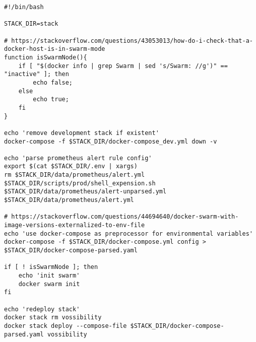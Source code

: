\begin{lstlisting}[style=bashStyle,caption={start-stack-services.sh},label=lst:start-stack-services]
#!/bin/bash

STACK_DIR=stack

# https://stackoverflow.com/questions/43053013/how-do-i-check-that-a-docker-host-is-in-swarm-mode
function isSwarmNode(){
    if [ "$(docker info | grep Swarm | sed 's/Swarm: //g')" == "inactive" ]; then
        echo false;
    else
        echo true;
    fi
}

echo 'remove development stack if existent'
docker-compose -f $STACK_DIR/docker-compose_dev.yml down -v

echo 'parse prometheus alert rule config'
export $(cat $STACK_DIR/.env | xargs)
rm $STACK_DIR/data/prometheus/alert.yml
$STACK_DIR/scripts/prod/shell_expension.sh $STACK_DIR/data/prometheus/alert-unparsed.yml $STACK_DIR/data/prometheus/alert.yml

# https://stackoverflow.com/questions/44694640/docker-swarm-with-image-versions-externalized-to-env-file
echo 'use docker-compose as preprocessor for environmental variables'
docker-compose -f $STACK_DIR/docker-compose.yml config > $STACK_DIR/docker-compose-parsed.yaml

if [ ! isSwarmNode ]; then
	echo 'init swarm'
	docker swarm init
fi

echo 'redeploy stack'
docker stack rm vossibility
docker stack deploy --compose-file $STACK_DIR/docker-compose-parsed.yaml vossibility

\end{lstlisting}

